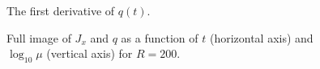 \documentclass[a4paper,11pt,twoside]{article}
\begin{document}
	\begin{figure}[!h]
        \centering{}
		\caption{The first derivative of $q(t)$.}
		\label{fig:qd}
	\end{figure}   	

	\begin{figure}[!h]
        \centering{}
		\caption{Full image of $J_{x}$ and $q$ as a function of $t$ (horizontal axis) and $\log_{10}\mu$ (vertical axis) for $R=200$.}
		\label{fig:fullqJx}
	\end{figure}   	

%
\printbibliography
%
\end{document}
